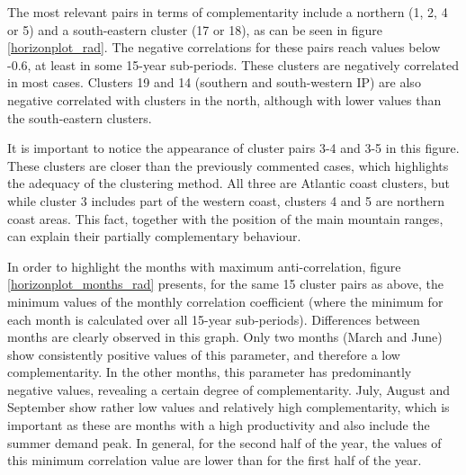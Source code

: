 The most relevant pairs in terms of complementarity include a northern (1, 2, 4 or 5) and a south-eastern cluster (17 or 18), as can be seen in figure \ref{horizonplot_rad}. The negative correlations for these pairs reach values below -0.6, at least in some 15-year sub-periods. These clusters are negatively correlated in most cases. Clusters 19 and 14 (southern and south-western IP) are also negative correlated with clusters in the north, although with lower values than the south-eastern clusters.

It is important to notice the appearance of cluster pairs 3-4 and 3-5 in this figure. These clusters are closer than the previously commented cases, which highlights the adequacy of the clustering method. All three are Atlantic coast clusters, but while cluster 3 includes part of the western coast, clusters 4 and 5 are northern coast areas. This fact, together with the position of the main mountain ranges, can explain their partially complementary behaviour.


In order to highlight the months with maximum anti-correlation,  figure \ref{horizonplot_months_rad} presents, for the same 15 cluster pairs as above, the minimum values of the monthly correlation coefficient (where the minimum for each month is calculated over all 15-year sub-periods). Differences between months are clearly observed in this graph. Only two months (March and June) show consistently positive values of this parameter, and therefore a low complementarity. In the other months, this parameter has predominantly negative values, revealing a certain degree of complementarity. July, August and September show rather low values and relatively high complementarity, which is important as these are months with a high productivity and also include the summer demand peak. In general,  for the second half of the year, the values of this minimum correlation value are lower than for the first half of the year.

